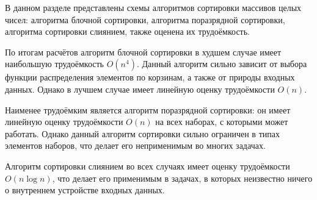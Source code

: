 В данном разделе представлены схемы алгоритмов сортировки массивов целых чисел: алгоритма блочной сортировки, алгоритма поразрядной сортировки, алгоритма сортировки слиянием, также оценена их трудоёмкость.

По итогам расчётов алгоритм блочной сортировки в худшем случае имеет наибольшую трудоёмкость $O(n^4)$. Данный алгоритм сильно зависит от выбора функции распределения элементов по корзинам, а также от природы входных данных. Однако в лучшем случае имеет линейную оценку трудоёмкости $O(n)$.


Наименее трудоёмким является алгоритм поразрядной сортировки: он имеет линейную оценку трудоёмкости $O(n)$ на всех  наборах, с которыми может работать. Однако данный алгоритм сортировки сильно ограничен в типах элементов наборов, что делает его неприменимым во многих задачах.


Алгоритм сортировки слиянием во всех случаях имеет оценку трудоёмкости $O(n\log n)$, что делает его применимым в задачах, в которых неизвестно ничего о внутреннем устройстве входных данных.

